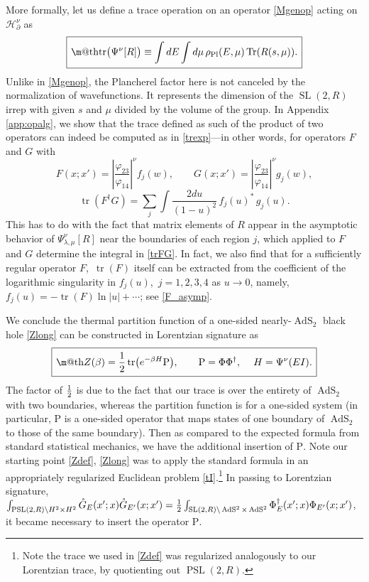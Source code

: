 \documentclass[12pt]{article}
\makeatletter
\newcommand{\be}{\begin{equation}}
\newcommand{\ee}{\end{equation}}
\newcommand*{\wideboxed}[1]{\setlength{\fboxsep}{1ex}%
  \fbox{\m@th$\displaystyle#1$}}
\newcommand{\vp}{\varphi}
\newcommand{\RR}{\mathbb{R}}
\DeclareMathOperator{\tr}{tr}
\DeclareMathOperator{\Tr}{Tr}
\DeclareMathOperator{\PSL}{PSL}
\DeclareMathOperator{\tSL}{\widetilde{\mathrm{SL}}}
\DeclareMathOperator{\tAdS}{\widetilde{AdS}}
\DeclareMathOperator{\HH}{H}
\newcommand{\rPl}{\rho_{\text{Pl}}}
\newcommand{\Rho}{\mathrm{P}}
\newcommand{\lam}{\lambda}
\newcommand{\ov}{\over}
\newcommand{\p}{\partial}
\def\widetilde#1{#1}%
\def\HH{H}
\def\RR{R}
\makeatother
\begin{document}
More formally, let us define a trace operation on an operator \eqref{Mgenop} acting on $\mathcal{H}^{\nu}_{\p}$ as
\be \label{M_tr_def}
\wideboxed{
\tr\bigl(\Psi^{\nu}[R]\bigr)
\equiv\int dE \int d\mu\,\rPl(E,\mu)\Tr(R(s,\mu)).}
\ee
Unlike in \eqref{Mgenop}, the Plancherel factor here is not canceled by the normalization of wavefunctions. It represents the dimension of the $\tSL(2,\RR)$ irrep with given $s$ and $\mu$ divided by the volume of the group. In Appendix \ref{app:opalg}, we show that the trace defined as such of the product of two operators can indeed be computed as in \eqref{trexp}---in other words, for operators $F$ and $G$ with
\begin{equation}
F(x;x')=\left|\frac{\vp_{23}}{\vp_{14}}\right|^{\nu}f_j(w),\qquad
G(x;x')=\left|\frac{\vp_{23}}{\vp_{14}}\right|^{\nu}g_j(w),
\end{equation}
\be \label{trFG}
\tr(F^{\dagger}G)=\sum_{j}\int \frac{2du}{(1-u)^2}\,f_j(u)^{*}\,g_j(u).
\ee
This has to do with the fact that matrix elements of $R$ appear in the asymptotic behavior of $\Psi^{\nu}_{\lam, \mu}[R]$ near the boundaries of each region $j$, which applied to $F$ and $G$ determine the integral in \eqref{trFG}. In fact, we also find that for a sufficiently regular operator $F$,\, $\tr(F)$ itself can be extracted from the coefficient of the logarithmic singularity in $f_{j}(u)$,\, $j=1,2,3,4$ as $u \to 0$, namely, $f_j(u) =-\tr (F) \ln |u|+\cdots$; see \eqref{F_asymp}.

We conclude the thermal partition function of a one-sided nearly-$\tAdS_2$ black hole \eqref{Zlong} can be constructed in Lorentzian signature as
\be \label{LorZ}
\wideboxed{
Z(\beta)={1 \ov 2}\tr\bigl(e^{-\beta H}\Rho\bigr), \qquad
\Rho=\Phi \Phi^{\dagger},\quad\: H=\Psi^{\nu}(EI).
}
\ee 
The factor of ${1 \ov 2}$ is due to the fact that our trace is over the entirety of $\tAdS_2$ with two boundaries, whereas the partition function is for a one-sided system (in particular, $\Rho$ is a one-sided operator that maps states of one boundary of $\tAdS_2$ to those of the same boundary). Then as compared to the expected formula from standard statistical mechanics, we have the additional insertion of $\Rho$. Note our starting point \eqref{Zdef}, \eqref{Zlong} was to apply the standard formula in an appropriately regularized Euclidean problem \eqref{tI}.\footnote{Note the trace we used in \eqref{Zdef} was regularized analogously to our Lorentzian trace, by quotienting out $\PSL(2,\RR)$.} In passing to Lorentzian signature, $\int_{\PSL(2,\RR)\backslash\HH^2 \times \HH^2} \mathring{G}_E(x';x)\mathring{G}_{E'}(x;x')={1 \ov 2}\int_{\tSL(2,\RR)\backslash \tAdS^2 \times \tAdS^2}\Phi^{\dagger}_{E}(x';x)\Phi_{E'}(x;x')$, it became necessary to insert the operator $\Rho$. 
\end{document}
